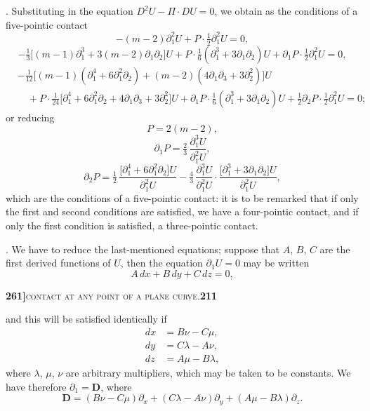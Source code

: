 \documentclass[11pt]{article}
\begin{document}
. Substituting in the equation $D^2U - \Pi \cdot DU = 0$, we obtain as the conditions of a five-pointic contact
\[
-(m-2)\partial_1^2 U + P \cdot \tfrac{1}{2}\partial_1^2 U = 0,
\]
\[
-\tfrac{1}{3}\bigl[(m-1)\partial_1^3 + 3(m-2)\partial_1\partial_2\bigr]U + P \cdot \tfrac{1}{6}(\partial_1^3 + 3\partial_1\partial_2)U + \partial_1 P \cdot \tfrac{1}{2}\partial_1^2 U = 0,
\]
\[
\begin{aligned}
&-\tfrac{1}{12}\bigl[(m-1)(\partial_1^4 + 6\partial_1^2\partial_2) + (m-2)(4\partial_1\partial_3 + 3\partial_2^2)\bigr]U\\
&\quad{}+ P \cdot \tfrac{1}{24}\bigl[\partial_1^4 + 6\partial_1^2\partial_2 + 4\partial_1\partial_3 + 3\partial_2^2\bigr]U + \partial_1 P \cdot \tfrac{1}{6}(\partial_1^3 + 3\partial_1\partial_2)U + \tfrac{1}{2}\partial_2 P \cdot \tfrac{1}{2}\partial_1^2 U = 0;
\end{aligned}
\]
or reducing
\[
P = 2(m - 2),
\]
\[
\partial_1 P = \tfrac{2}{3}\,\frac{\partial_1^3 U}{\partial_1^2 U},
\]
\[
\partial_2 P = \tfrac{1}{2}\,\frac{\bigl[\partial_1^4 + 6\partial_1^2\partial_2\bigr]U}{\partial_1^2 U}
              - \tfrac{4}{3}\,\frac{\partial_1^3 U}{\partial_1^2 U}\cdot\frac{\bigl[\partial_1^3 + 3\partial_1\partial_2\bigr]U}{\partial_1^2 U},
\]
which are the conditions of a five-pointic contact: it is to be remarked that if only the first and second conditions are satisfied, we have a four-pointic contact, and if only the first condition is satisfied, a three-pointic contact.

\medskip

. We have to reduce the last-mentioned equations; suppose that $A$, $B$, $C$ are the first derived functions of $U$, then the equation $\partial_1 U = 0$ may be written
\[
A\,dx + B\,dy + C\,dz = 0,
\]

\newpage

\noindent\textbf{261]}\hfill\textsc{contact at any point of a plane curve.}\hfill\textbf{211}

\medskip

\noindent and this will be satisfied identically if
\[
\begin{aligned}
dx &= B\nu - C\mu,\\
dy &= C\lambda - A\nu,\\
dz &= A\mu - B\lambda,
\end{aligned}
\]
where $\lambda$, $\mu$, $\nu$ are arbitrary multipliers, which may be taken to be constants. We have therefore $\partial_1 = \mathbf{D}$, where
\[
\mathbf{D} = (B\nu - C\mu)\partial_x + (C\lambda - A\nu)\partial_y + (A\mu - B\lambda)\partial_z.
\]
\end{document}

